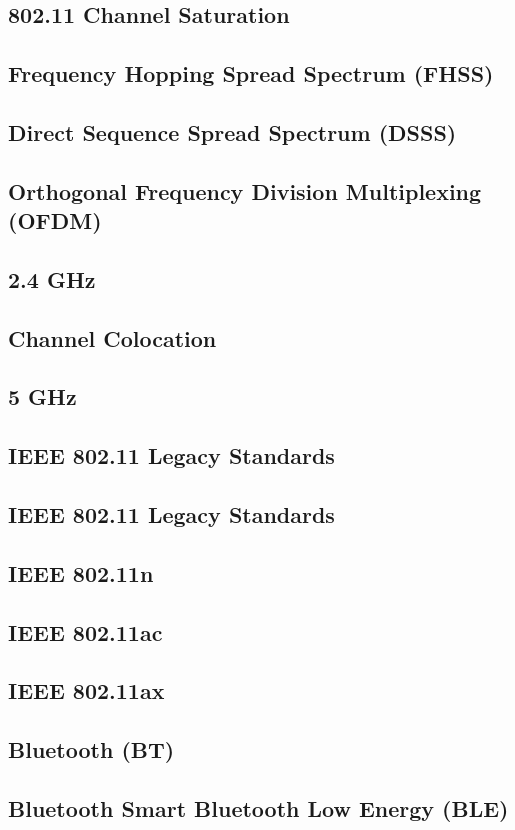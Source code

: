 \documentclass[11pt]{article}
\begin{document}
\subsection{802.11 Channel Saturation}
\subsection{Frequency Hopping Spread Spectrum (FHSS)}
\subsection{Direct Sequence Spread Spectrum (DSSS)}
\subsection{Orthogonal Frequency Division Multiplexing (OFDM)}
\subsection{2.4 GHz}
\subsection{Channel Colocation}
\subsection{5 GHz}
\subsection{IEEE 802.11 Legacy Standards}
\subsection{IEEE 802.11 Legacy Standards}
\subsection{IEEE 802.11n}
\subsection{IEEE 802.11ac}
\subsection{IEEE 802.11ax}
\subsection{Bluetooth (BT)}
\subsection{Bluetooth Smart Bluetooth Low Energy (BLE)}
\end{document}
